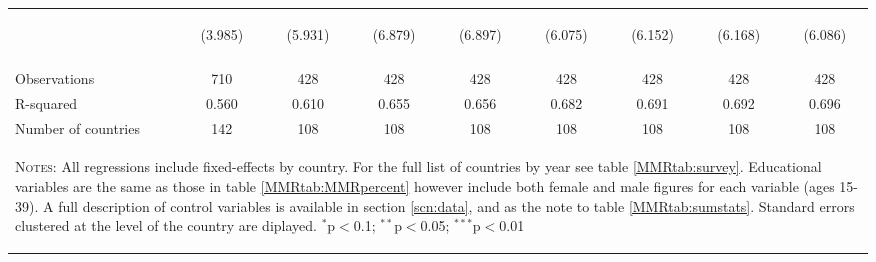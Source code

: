 \begin{landscape}
\begin{table}[htpb!]
\begin{center}
\begin{tabular}{lcccccccc}
&\begin{footnotesize}(3.985)\end{footnotesize}&\begin{footnotesize}(5.931)\end{footnotesize}&\begin{footnotesize}(6.879)\end{footnotesize}&\begin{footnotesize}(6.897)\end{footnotesize}&\begin{footnotesize}(6.075)\end{footnotesize}&\begin{footnotesize}(6.152)\end{footnotesize}&\begin{footnotesize}(6.168)\end{footnotesize}&\begin{footnotesize}(6.086)\end{footnotesize}\\
&&&&&&&&\\Observations&710&428&428&428&428&428&428&428\\
R-squared&0.560&0.610&0.655&0.656&0.682&0.691&0.692&0.696\\
Number of countries&142&108&108&108&108&108&108&108\\
\midrule
\multicolumn{9}{p{20cm}}{\begin{footnotesize}\textsc{Notes:} All regressions include fixed-effects by country. For the full list of countries by year see table \ref{MMRtab:survey}. Educational variables are the same as those in table \ref{MMRtab:MMRpercent} however include both female and male figures for each variable (ages 15-39). A full description of control variables is available in section \ref{scn:data}, and as the note to table \ref{MMRtab:sumstats}.  Standard errors clustered at the level of the country are diplayed.
$^{*}$p$<$0.1; $^{**}$p$<$0.05; $^{***}$p$<$0.01\end{footnotesize}} \\ \bottomrule 
\end{tabular}\end{center}\end{table}\end{landscape}